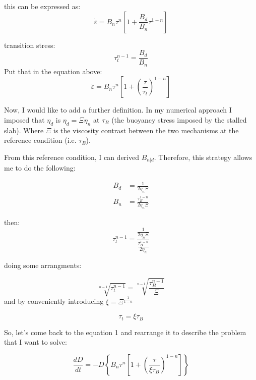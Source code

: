 \documentclass{article}
\begin{document}
this can be expressed as:
\begin{equation}
    \dot{\varepsilon} = B_{n} \tau^n \left[1 + \frac{B_{d}}{B_{n}} \tau^{1-n}\right]
    \label{eq:rheology1}
\end{equation}

transition stress:
\begin{equation}
      \tau_t^{n-1} = \frac{B_{d}}{B_{n}}
\end{equation}
Put that in the equation above:
\begin{equation}
    \dot{\varepsilon} = B_{n} \tau^n \left[1 + \left(\frac{\tau}{\tau_t}\right)^{1-n}\right]
    \label{eq:rheology2}
\end{equation}

Now, I would like to add a further definition. In my numerical approach I imposed that $\eta_d$ is $\eta_d = \Xi \eta_n$ at $\tau_{B}$ (the buoyancy stress imposed by the stalled slab). Where $\Xi$ is the viscosity contrast between the two mechanisms at the reference condition (i.e. $\tau_B$). 

From this reference condition, I can derived $B_{n|d}$. Therefore, this strategy allows me to do the following: 

\begin{align}
B_d &= \frac{1}{2\eta_n\Xi} \\
B_n &= \frac{\tau_B^{1-n}}{2\eta_n\Xi}    
\end{align}

then: 
\begin{equation}
    \tau_t^{n-1} = \frac{\frac{1}{2\eta_n\Xi}}{\frac{\tau_B^{1-n}}{2\eta_n}}
    \label{eq:transition_stress0}
\end{equation}

doing some arrangments: 

\begin{equation}
     \sqrt[n-1]{\tau_t^{n-1}} =  \sqrt[n-1]{\frac{\tau_B^{n-1}}{\Xi}}
    \label{eq:transition_stress1}
\end{equation}
and by conveniently introducing $\xi = \Xi^\frac{1}{1-n}$

\begin{equation}
    \tau_t = \xi\tau_B
    \label{eq:transition_stress2}
\end{equation}


So, let's come back to the equation 1 and rearrange it to describe the problem that I want to solve: 

\begin{equation}
    \frac{dD}{dt} = -D \left\{ B_n \tau^n \left[ 1+ \left( \frac{\tau}{\xi \tau_B} \right)^{1-n} \right] \right\}
    \label{eq:equation_neck0}
\end{equation}
\end{document}

